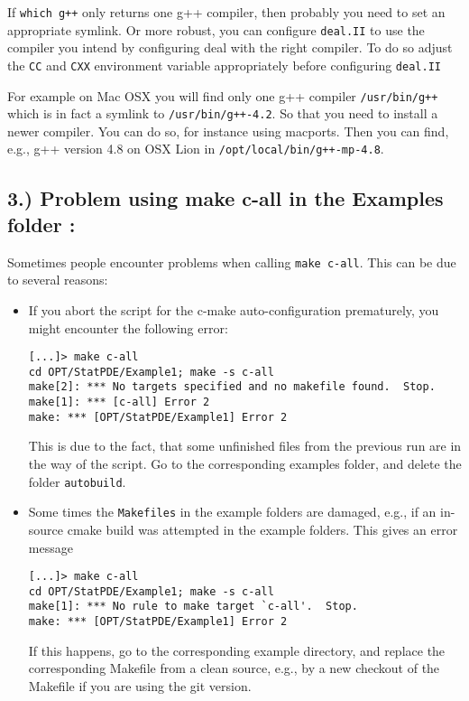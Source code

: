   If \texttt{which g++} only returns one g++ compiler, then probably you need to
  set an appropriate symlink. Or more robust, you can configure \texttt{deal.II}
  to use the compiler you intend by configuring deal with the right compiler. To
  do so adjust  the \texttt{CC} and \texttt{CXX} environment variable appropriately
  before configuring \texttt{deal.II}
  
  For example on Mac OSX you will find only one g++ compiler \texttt{/usr/bin/g++}
  which is in fact a symlink to \texttt{/usr/bin/g++-4.2}. 
  So that you need to install a newer compiler. You can do so, for instance
  using macports. Then you can find, e.g., g++ version 4.8 on OSX Lion 
  in \texttt{/opt/local/bin/g++-mp-4.8}. 


\subsection*{3.) Problem using make c-all in the Examples folder :}
Sometimes people encounter problems when calling \texttt{make c-all}. 
This can be due to several reasons:
\begin{itemize}
\item If you abort the script for the c-make auto-configuration prematurely,
you might encounter the following error:
{\small
\begin{lstlisting}
[...]> make c-all
cd OPT/StatPDE/Example1; make -s c-all
make[2]: *** No targets specified and no makefile found.  Stop.
make[1]: *** [c-all] Error 2
make: *** [OPT/StatPDE/Example1] Error 2
\end{lstlisting}
}
This is due to the fact, that some unfinished files from the previous
run are in the way of the script. Go to the corresponding examples
folder, and delete the folder \texttt{autobuild}. 

\item Some times the \texttt{Makefiles} in the example folders are
  damaged, e.g., if an in-source cmake build was attempted in the
  example folders. This gives an error message 
{\small
\begin{lstlisting}
[...]> make c-all
cd OPT/StatPDE/Example1; make -s c-all
make[1]: *** No rule to make target `c-all'.  Stop.
make: *** [OPT/StatPDE/Example1] Error 2   
\end{lstlisting}
}
If this happens, go to the corresponding example directory, and replace
the corresponding Makefile from a clean source, e.g., by a new
checkout of the Makefile if you are using the git version.
\end{itemize}

